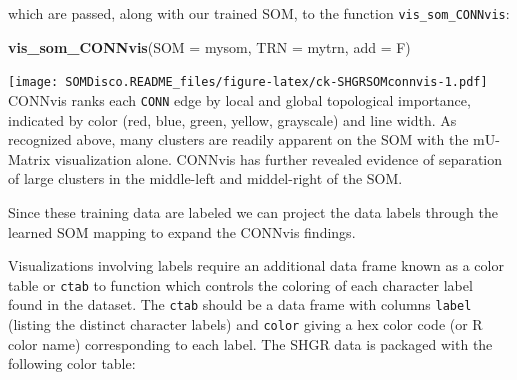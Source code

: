 \documentclass[]{article}
\newenvironment{Shaded}{\begin{snugshade}}{\end{snugshade}}
\newcommand{\CommentTok}[1]{\textcolor[rgb]{0.56,0.35,0.01}{\textit{#1}}}
\newcommand{\DataTypeTok}[1]{\textcolor[rgb]{0.13,0.29,0.53}{#1}}
\newcommand{\KeywordTok}[1]{\textcolor[rgb]{0.13,0.29,0.53}{\textbf{#1}}}
\newcommand{\NormalTok}[1]{#1}
\newcommand{\OperatorTok}[1]{\textcolor[rgb]{0.81,0.36,0.00}{\textbf{#1}}}
\begin{document}
which are passed, along with our trained SOM, to the function \texttt{vis\_som\_CONNvis}:

\begin{Shaded}
\begin{Highlighting}[]
\KeywordTok{vis_som_CONNvis}\NormalTok{(}\DataTypeTok{SOM =}\NormalTok{ mysom, }\DataTypeTok{TRN =}\NormalTok{ mytrn, }\DataTypeTok{add =}\NormalTok{ F)}
\end{Highlighting}
\end{Shaded}

\texttt{[image: SOMDisco.README\_files/figure-latex/ck-SHGRSOMconnvis-1.pdf]}
CONNvis ranks each \texttt{CONN} edge by local and global topological importance, indicated by color (red, blue, green, yellow, grayscale) and line width. As recognized above, many clusters are readily apparent on the SOM with the mU-Matrix visualization alone. CONNvis has further revealed evidence of separation of large clusters in the middle-left and middel-right of the SOM.

Since these training data are labeled we can project the data labels through the learned SOM mapping to expand the CONNvis findings.

\begin{Shaded}
\end{Shaded}

Visualizations involving labels require an additional data frame known as a color table or \texttt{ctab} to function which controls the coloring of each character label found in the dataset. The \texttt{ctab} should be a data frame with columns \texttt{label} (listing the distinct character labels) and \texttt{color} giving a hex color code (or R color name) corresponding to each label. The SHGR data is packaged with the following color table:

\begin{Shaded}
\end{Shaded}
\end{document}

